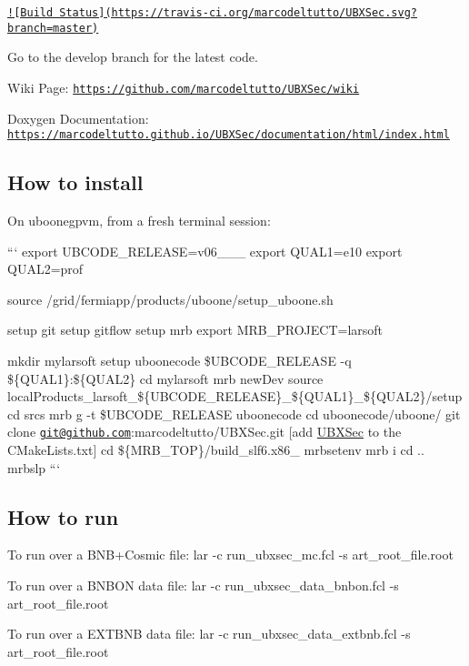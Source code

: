 \href{https://travis-ci.org/marcodeltutto/UBXSec}{\tt !\mbox{[}Build Status\mbox{]}(https\-://travis-\/ci.\-org/marcodeltutto/\-U\-B\-X\-Sec.\-svg?branch=master)}

Go to the develop branch for the latest code.

Wiki Page\-: \href{https://github.com/marcodeltutto/UBXSec/wiki}{\tt https\-://github.\-com/marcodeltutto/\-U\-B\-X\-Sec/wiki}

Doxygen Documentation\-: \href{https://marcodeltutto.github.io/UBXSec/documentation/html/index.html}{\tt https\-://marcodeltutto.\-github.\-io/\-U\-B\-X\-Sec/documentation/html/index.\-html}

\subsection*{How to install}

On uboonegpvm, from a fresh terminal session\-:

``` export U\-B\-C\-O\-D\-E\-\_\-\-R\-E\-L\-E\-A\-S\-E=v06\-\_\-\_\-\_ export Q\-U\-A\-L1=e10 export Q\-U\-A\-L2=prof

source /grid/fermiapp/products/uboone/setup\-\_\-uboone.sh

setup git setup gitflow setup mrb export M\-R\-B\-\_\-\-P\-R\-O\-J\-E\-C\-T=larsoft

mkdir mylarsoft setup uboonecode \$\-U\-B\-C\-O\-D\-E\-\_\-\-R\-E\-L\-E\-A\-S\-E -\/q \$\{Q\-U\-A\-L1\}\-:\$\{Q\-U\-A\-L2\} cd mylarsoft mrb new\-Dev source local\-Products\-\_\-larsoft\-\_\-\$\{U\-B\-C\-O\-D\-E\-\_\-\-R\-E\-L\-E\-A\-S\-E\}\-\_\-\$\{Q\-U\-A\-L1\}\-\_\-\$\{Q\-U\-A\-L2\}/setup cd srcs mrb g -\/t \$\-U\-B\-C\-O\-D\-E\-\_\-\-R\-E\-L\-E\-A\-S\-E uboonecode cd uboonecode/uboone/ git clone \href{mailto:git@github.com}{\tt git@github.\-com}\-:marcodeltutto/\-U\-B\-X\-Sec.\-git \mbox{[}add \hyperlink{classUBXSec}{U\-B\-X\-Sec} to the C\-Make\-Lists.\-txt\mbox{]} cd \$\{M\-R\-B\-\_\-\-T\-O\-P\}/build\-\_\-slf6.x86\-\_ mrbsetenv mrb i cd .. mrbslp ```

\subsection*{How to run}

To run over a B\-N\-B+\-Cosmic file\-: {\ttfamily lar -\/c run\-\_\-ubxsec\-\_\-mc.\-fcl -\/s art\-\_\-root\-\_\-file.\-root}

To run over a B\-N\-B\-O\-N data file\-: {\ttfamily lar -\/c run\-\_\-ubxsec\-\_\-data\-\_\-bnbon.\-fcl -\/s art\-\_\-root\-\_\-file.\-root}

To run over a E\-X\-T\-B\-N\-B data file\-: {\ttfamily lar -\/c run\-\_\-ubxsec\-\_\-data\-\_\-extbnb.\-fcl -\/s art\-\_\-root\-\_\-file.\-root} 